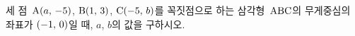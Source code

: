 세 점~$\mathrm{A}(a,\mkern3mu -5)$, $\mathrm{B}(1,\mkern3mu 3)$, $\mathrm{C}(-5,\mkern3mu b)$를 꼭짓점으로 하는 삼각형~$\mathrm{ABC}$의 무게중심의 좌표가 $(-1,\mkern3mu 0)$일 때, $a$, $b$의 값을 구하시오.
